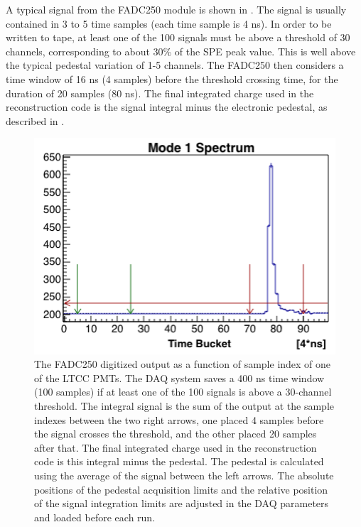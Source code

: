 A typical signal from the FADC250 module is shown in . The signal is usually contained in 3 to 5 time samples
(each time sample is 4 ns).
In order to be written to tape, at least one of the 100 signals must be above a threshold of 30 channels, corresponding to about
30\% of the SPE peak value. This is well above the typical pedestal variation of 1-5 channels.
The FADC250 then considers a time window of 16 ns (4 samples) before the threshold crossing time, for the duration
of 20 samples (80 ns). The final integrated charge used in the reconstruction code is the signal integral
minus the electronic pedestal, as described in .



\begin{figure}
	\centering
	\includegraphics[width=0.99\columnwidth,keepaspectratio]{img/fadc.png}
	\caption{The FADC250 digitized output as a function of sample index of one of the LTCC PMTs.
             The DAQ system saves a 400 ns time window (100 samples) if at least one of the 100 signals is above a 30-channel threshold.
		     The integral signal is the sum of the output at the sample indexes between the two right arrows,
             one placed 4 samples before the signal crosses the threshold, and the other placed 20 samples after that.
             The final integrated charge used in the reconstruction code is this integral minus the pedestal.
             The pedestal is calculated using the average of the signal between the left arrows.
		     The absolute positions of the pedestal acquisition limits and the relative position of the signal integration
             limits are adjusted in the DAQ parameters and loaded before each run.}
	\label{fig:fadc}
\end{figure}




